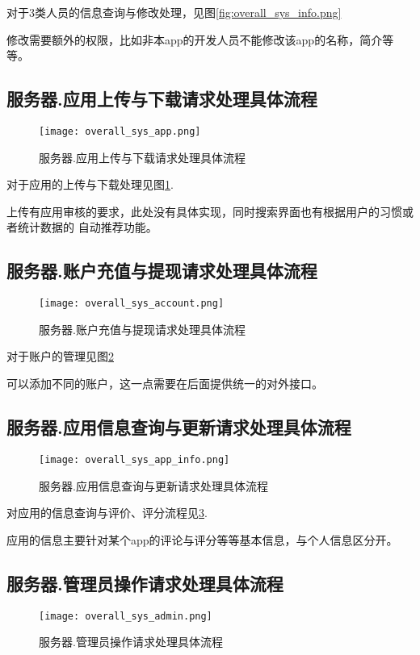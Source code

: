 对于3类人员的信息查询与修改处理，见图\ref{fig:overall_sys_info.png}

修改需要额外的权限，比如非本app的开发人员不能修改该app的名称，简介等等。

\subsection{服务器.应用上传与下载请求处理具体流程}
\begin{figure}[ht]
	\centering
	\texttt{[image: overall\_sys\_app.png]}
	\caption{服务器.应用上传与下载请求处理具体流程} \label{fig:overall_sys_app.png}
\end{figure}

对于应用的上传与下载处理见图\ref{fig:overall_sys_app.png}.

上传有应用审核的要求，此处没有具体实现，同时搜索界面也有根据用户的习惯或者统计数据的
自动推荐功能。

\subsection{服务器.账户充值与提现请求处理具体流程}
\begin{figure}[ht]
	\centering
	\texttt{[image: overall\_sys\_account.png]}
	\caption{服务器.账户充值与提现请求处理具体流程} \label{fig:overall_sys_account.png}
\end{figure}

对于账户的管理见图\ref{fig:overall_sys_account.png}

可以添加不同的账户，这一点需要在后面提供统一的对外接口。

\subsection{服务器.应用信息查询与更新请求处理具体流程}
\begin{figure}[ht]
	\centering
	\texttt{[image: overall\_sys\_app\_info.png]}
	\caption{服务器.应用信息查询与更新请求处理具体流程} \label{fig:overall_sys_app_info.png}
\end{figure}

对应用的信息查询与评价、评分流程见\ref{fig:overall_sys_app_info.png}.

应用的信息主要针对某个app的评论与评分等等基本信息，与个人信息区分开。

\subsection{服务器.管理员操作请求处理具体流程}
\begin{figure}[ht]
	\centering
	\texttt{[image: overall\_sys\_admin.png]}
	\caption{服务器.管理员操作请求处理具体流程} \label{fig:overall_sys_admin.png}
\end{figure}

